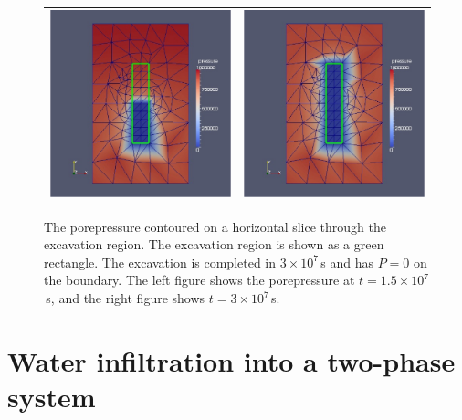 \documentclass[]{scrreprt}
\begin{document}
\begin{figure}[htb]
\centering
\begin{tabular}{cc}
\includegraphics[width=8cm]{ex02_1.5.eps} &
\includegraphics[width=8cm]{ex02_3.eps}
\end{tabular}
\caption{The porepressure contoured on a horizontal slice through the
  excavation region.  The excavation region is shown as a green
  rectangle.  The excavation is completed in $3\times 10^{7}$\,s and
  has $P=0$ on the boundary.  The left figure shows the porepressure
  at $t=1.5\times 10^{7}$\,s, and the right figure shows $t=3\times
  10^{7}$\,s.}
\label{ex02.fig}
\end{figure}




\chapter{Water infiltration into a two-phase system}
\label{rsc}
\end{document}
